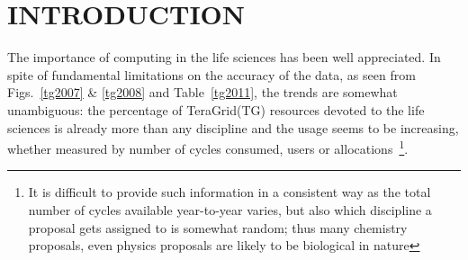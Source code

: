 \documentclass[]{article}
\begin{document}



\section{INTRODUCTION}


The importance of computing in the life sciences has been well
appreciated. %
In spite of fundamental limitations on the accuracy of the data, as
seen from Figs.~\ref{tg2007} \& \ref{tg2008} and Table~\ref{tg2011},
the trends are somewhat unambiguous: the percentage of TeraGrid(TG)
resources devoted to the life sciences is already more than any
discipline and the usage seems to be increasing, whether measured by
number of cycles consumed, users or allocations~\footnote{It is
  difficult to provide such information in a consistent way as the
  total number of cycles available year-to-year varies, but also which
  discipline a proposal gets assigned to is somewhat random; thus many
  chemistry proposals, even physics proposals are likely to be
  biological in nature}.

\end{document}
